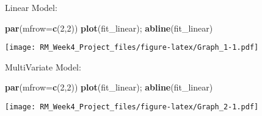\documentclass[]{article}
\newenvironment{Shaded}{\begin{snugshade}}{\end{snugshade}}
\newcommand{\KeywordTok}[1]{\textcolor[rgb]{0.13,0.29,0.53}{\textbf{#1}}}
\newcommand{\DataTypeTok}[1]{\textcolor[rgb]{0.13,0.29,0.53}{#1}}
\newcommand{\DecValTok}[1]{\textcolor[rgb]{0.00,0.00,0.81}{#1}}
\newcommand{\NormalTok}[1]{#1}
\begin{document}
Linear Model:

\begin{Shaded}
\begin{Highlighting}[]
\KeywordTok{par}\NormalTok{(}\DataTypeTok{mfrow=}\KeywordTok{c}\NormalTok{(}\DecValTok{2}\NormalTok{,}\DecValTok{2}\NormalTok{))}
\KeywordTok{plot}\NormalTok{(fit_linear); }
\KeywordTok{abline}\NormalTok{(fit_linear)}
\end{Highlighting}
\end{Shaded}

\texttt{[image: RM\_Week4\_Project\_files/figure-latex/Graph\_1-1.pdf]}

MultiVariate Model:

\begin{Shaded}
\begin{Highlighting}[]
\KeywordTok{par}\NormalTok{(}\DataTypeTok{mfrow=}\KeywordTok{c}\NormalTok{(}\DecValTok{2}\NormalTok{,}\DecValTok{2}\NormalTok{))}
\KeywordTok{plot}\NormalTok{(fit_linear); }
\KeywordTok{abline}\NormalTok{(fit_linear)}
\end{Highlighting}
\end{Shaded}

\texttt{[image: RM\_Week4\_Project\_files/figure-latex/Graph\_2-1.pdf]}
\end{document}
